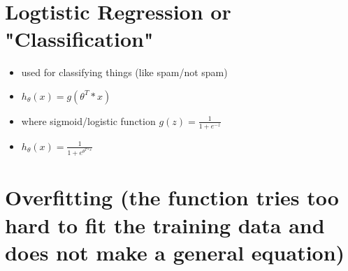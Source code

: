\documentclass[]{article}
\begin{document}
\section{Logtistic Regression or "Classification"}
\begin{itemize}
	\item used for classifying things (like spam/not spam)
	\item $ h_{\theta}(x) = g(\theta^T*x)$
	\item where sigmoid/logistic function $g(z) =\frac{1}{1+e^{-z}}$
	\item $ h_{\theta}(x)=\frac{1}{1+e^{\theta^{T*x}}} $
\end{itemize}

\section{Overfitting (the function tries too hard to fit the training data and does not make a general equation)}
\end{document}
